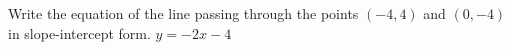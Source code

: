 {Write the equation of the line passing through the points $(-4,4)$ and $(0,-4)$ in slope-intercept form.}
{$y=-2x-4$}
